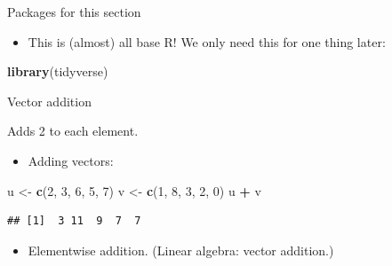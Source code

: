 \documentclass[ignorenonframetext,]{beamer}
\newenvironment{Shaded}{\begin{snugshade}}{\end{snugshade}}
\newcommand{\DecValTok}[1]{\textcolor[rgb]{0.00,0.00,0.81}{#1}}
\newcommand{\KeywordTok}[1]{\textcolor[rgb]{0.13,0.29,0.53}{\textbf{#1}}}
\newcommand{\NormalTok}[1]{#1}
\newcommand{\OperatorTok}[1]{\textcolor[rgb]{0.81,0.36,0.00}{\textbf{#1}}}
\newcommand{\StringTok}[1]{\textcolor[rgb]{0.31,0.60,0.02}{#1}}
\providecommand{\tightlist}{%
  \setlength{\itemsep}{0pt}\setlength{\parskip}{0pt}}
\begin{document}
\begin{frame}[fragile]{Packages for this section}
\protect\hypertarget{packages-for-this-section-10}{}

\begin{itemize}
\tightlist
\item
  This is (almost) all base R! We only need this for one thing later:
\end{itemize}

\begin{Shaded}
\begin{Highlighting}[]
\KeywordTok{library}\NormalTok{(tidyverse)}
\end{Highlighting}
\end{Shaded}

\end{frame}

\begin{frame}[fragile]{Vector addition}
\protect\hypertarget{vector-addition}{}

Adds 2 to each element.

\begin{itemize}
\tightlist
\item
  Adding vectors:
\end{itemize}

\begin{Shaded}
\begin{Highlighting}[]
\NormalTok{u <-}\StringTok{ }\KeywordTok{c}\NormalTok{(}\DecValTok{2}\NormalTok{, }\DecValTok{3}\NormalTok{, }\DecValTok{6}\NormalTok{, }\DecValTok{5}\NormalTok{, }\DecValTok{7}\NormalTok{)}
\NormalTok{v <-}\StringTok{ }\KeywordTok{c}\NormalTok{(}\DecValTok{1}\NormalTok{, }\DecValTok{8}\NormalTok{, }\DecValTok{3}\NormalTok{, }\DecValTok{2}\NormalTok{, }\DecValTok{0}\NormalTok{)}
\NormalTok{u }\OperatorTok{+}\StringTok{ }\NormalTok{v}
\end{Highlighting}
\end{Shaded}

\begin{verbatim}
## [1]  3 11  9  7  7
\end{verbatim}

\begin{itemize}
\tightlist
\item
  Elementwise addition. (Linear algebra: vector addition.)
\end{itemize}

\end{frame}
\end{document}
